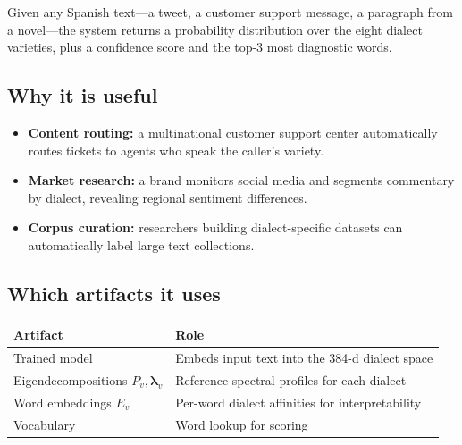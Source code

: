 \documentclass[11pt,a4paper]{article}
\begin{document}
\begin{appbox}
Given any Spanish text---a tweet, a customer support message, a
paragraph from a novel---the system returns a probability distribution
over the eight dialect varieties, plus a confidence score and the
top-3 most diagnostic words.
\end{appbox}

\subsection{Why it is useful}

\begin{itemize}[nosep]
  \item \textbf{Content routing:} a multinational customer support
        center automatically routes tickets to agents who speak the
        caller's variety.
  \item \textbf{Market research:} a brand monitors social media and
        segments commentary by dialect, revealing regional sentiment
        differences.
  \item \textbf{Corpus curation:} researchers building dialect-specific
        datasets can automatically label large text collections.
\end{itemize}

\subsection{Which artifacts it uses}

\begin{center}
\begin{tabular}{ll}
\toprule
\textbf{Artifact} & \textbf{Role} \\
\midrule
Trained model & Embeds input text into the 384-d dialect space \\
Eigendecompositions $P_v, \boldsymbol{\lambda}_v$ &
  Reference spectral profiles for each dialect \\
Word embeddings $E_v$ & Per-word dialect affinities for
  interpretability \\
Vocabulary & Word lookup for scoring \\
\bottomrule
\end{tabular}
\end{center}
\end{document}
